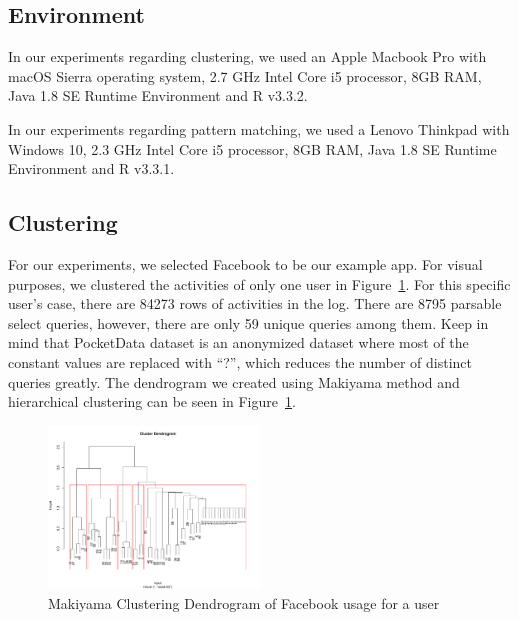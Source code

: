 
\subsection{Environment}

In our experiments regarding clustering, we used an Apple Macbook Pro with macOS Sierra operating system, 2.7 GHz Intel Core i5 processor, 8GB RAM, Java 1.8 SE Runtime Environment and R v3.3.2.

In our experiments regarding pattern matching, we used a Lenovo Thinkpad with Windows 10, 2.3 GHz Intel Core i5 processor, 8GB RAM, Java 1.8 SE Runtime Environment and R v3.3.1.

\subsection{Clustering}

For our experiments, we selected Facebook to be our example app. For visual purposes, we clustered the activities of only one user in Figure~\ref{fig:dendrogram}. For this specific user's case, there are 84273 rows of activities in the log. There are 8795 parsable select queries, however, there are only 59 unique queries among them. Keep in mind that PocketData dataset is an anonymized dataset where most of the constant values are replaced with ``?'', which reduces the number of distinct queries greatly. The dendrogram we created using Makiyama method and hierarchical clustering can be seen in Figure~\ref{fig:dendrogram}.

\begin{figure}[h!]
    \centering
    \includegraphics[width=0.5\textwidth]{graphics/User1}
    \caption{Makiyama Clustering Dendrogram of Facebook usage for a user}
    \label{fig:dendrogram}
\end{figure}

